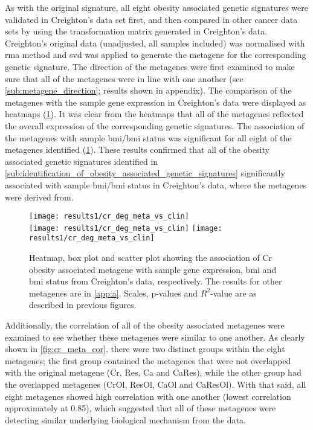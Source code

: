As with the original signature, all eight obesity associated genetic signatures were validated in Creighton's data set first, and then compared in other cancer data sets by using the transformation matrix generated in Creighton's data.
Creighton's original data (unadjusted, all samples included) was normalised with \gls{rma} method and \gls{svd} was applied to generate the metagene for the corresponding genetic signature.
The direction of the metagenes were first examined to make sure that all of the metagenes were in line with one another (see \cref{sub:metagene_direction}; results shown in appendix).
The comparison of the metagenes with the sample gene expression in Creighton's data were displayed as heatmaps (\cref{fig:degmetacr}).
It was clear from the heatmaps that all of the metagenes reflected the overall expression of the corresponding genetic signatures.
The association of the metagenes with sample \gls{bmi}/\gls{bmi} status was significant for all eight of the metagenes identified (\cref{fig:degmetacr}).
These results confirmed that all of the obesity associated genetic signatures identified in \cref{sub:identification_of_obesity_associated_genetic_signatures} significantly associated with sample \gls{bmi}/\gls{bmi} status in Creighton's data, where the metagenes were derived from.

\begin{figure}[htp!]
	\centering
	\texttt{[image: results1/cr\_deg\_meta\_vs\_clin]}\\
	\vspace{1em}
	\texttt{[image: results1/cr\_deg\_meta\_vs\_clin]}
	\hfill
	\texttt{[image: results1/cr\_deg\_meta\_vs\_clin]}
	\caption[Cr obesity associated metagene in Creighton's data]{Heatmap, box plot and scatter plot showing the association of Cr obesity associated metagene with sample gene expression, \gls{bmi} and \gls{bmi} status from Creighton's data, respectively.
	The results for other metagenes are in \cref{app:a}.
	Scales, p-values and $R^2$-value are as described in previous figures.}
	\label{fig:degmetacr}
\end{figure}

Additionally, the correlation of all of the obesity associated metagenes were examined to see whether these metagenes were similar to one another.
As clearly shown in \cref{fig:cr_meta_cor}, there were two distinct groups within the eight metagenes; the first group contained the metagenes that were not overlapped with the original metagene (Cr, Res, Ca and CaRes), while the other group had the overlapped metagenes (CrOl, ResOl, CaOl and CaResOl).
With that said, all eight metagenes showed high correlation with one another (lowest correlation approximately at 0.85), which suggested that all of these metagenes were detecting similar underlying biological mechanism from the data.

